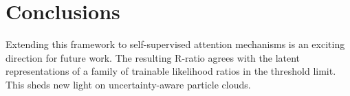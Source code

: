 \section{Conclusions}\label{sec:conclusions}

Extending this framework to self-supervised attention mechanisms is an
exciting direction for future work. The resulting R-ratio agrees with
the latent representations of a family of trainable likelihood ratios in
the threshold limit. This sheds new light on uncertainty-aware particle
clouds.

